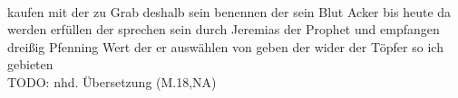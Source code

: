 \begin{exe}
\ex \label{ex:M3723} \gll \object{*** }    \object{***}  \object{*** }   \object{; }    \object{*** }                     \object{*** }      \object{*** }      \object{*** }    \\
{} {kaufen} {mit} {der} {} {} {} {zu} {Grab} {} {deshalb} {sein} {benennen} {} {der} {sein} {Blut} {Acker} {bis} {heute} {da} {werden} {erfüllen} {der} {sprechen} {sein} {durch} {Jeremias} {der} {Prophet} {und} {empfangen} {dreißig} {Pfenning} {} {Wert} {der} {er} {auswählen} {von} {} {geben} {der} {wider} {der} {Töpfer} {} {so} {ich} {gebieten}\\
\glt TODO: nhd. Übersetzung (M.18,NA)
\end{exe}
